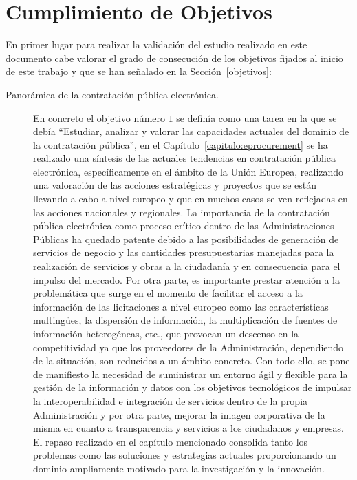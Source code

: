 \section{Cumplimiento de Objetivos}
En primer lugar para realizar la validación del estudio realizado en este documento cabe valorar el grado 
de consecución de los objetivos fijados al inicio de este trabajo y que se han señalado en la 
Sección~\ref{objetivos}:

\begin{description}
\item [Panorámica de la contratación pública electrónica.] En concreto el objetivo número $1$ se 
definía como una tarea en la que se debía ``Estudiar, analizar y valorar las capacidades actuales del dominio de la contratación pública'', 
en el Capítulo~\ref{capitulo:eprocurement} se ha realizado una síntesis de las actuales tendencias en contratación 
pública electrónica, específicamente en el ámbito de la Unión \gls{Europea}, realizando una valoración de las acciones 
estratégicas y proyectos que se están llevando a cabo a nivel europeo y que en muchos casos se ven reflejadas 
en las acciones nacionales y regionales. La importancia de la contratación pública electrónica como proceso 
crítico dentro de las Administraciones Públicas ha quedado patente debido a las posibilidades de generación 
de servicios de negocio y las cantidades presupuestarias manejadas para la realización de servicios y obras 
a la ciudadanía y en consecuencia para el impulso del mercado. Por otra parte, es importante prestar atención 
a la problemática que surge en el momento de facilitar el acceso a la información de las licitaciones a nivel 
europeo como las características multing\"{u}es, la dispersión de información, la multiplicación de fuentes 
de información heterogéneas, etc., que provocan un descenso en la competitividad ya que los proveedores de la Administración, 
dependiendo de la situación, son reducidos a un ámbito concreto. Con todo ello, se pone de manifiesto la necesidad de 
suministrar un entorno ágil y flexible para la gestión de la información y datos con los objetivos tecnológicos 
de impulsar la interoperabilidad e integración de servicios dentro de la propia Administración y por otra parte, 
mejorar la imagen corporativa de la misma en cuanto a transparencia y servicios a los ciudadanos y empresas. El repaso 
realizado en el capítulo mencionado consolida tanto los problemas como las soluciones y estrategias actuales proporcionando 
un dominio ampliamente motivado para la investigación y la innovación.


\end{description}
